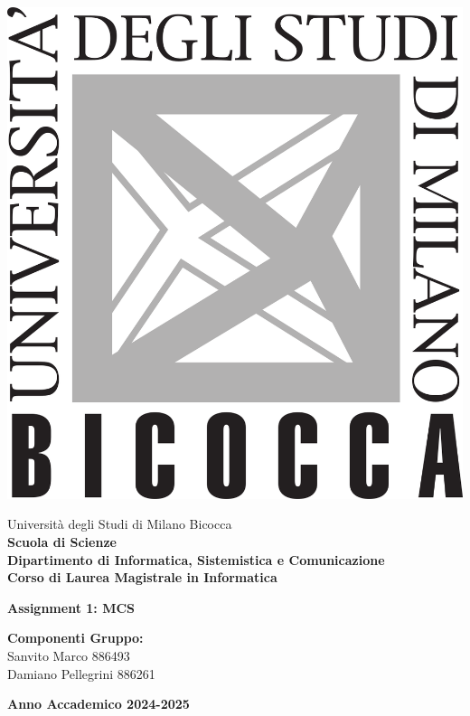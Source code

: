 \setlength\intextsep{0pt}

\noindent
\begin{minipage}{0.2\textwidth}
  \includegraphics[width=5\baselineskip]{images/bicocca_logo.png}
\end{minipage}%
\begin{minipage}{0.8\textwidth}
  Università degli Studi di Milano Bicocca \\[8pt]
  \textbf{Scuola di Scienze} \\[8pt]
  \textbf{Dipartimento di Informatica, Sistemistica e Comunicazione}\\[8pt]
  \textbf{Corso di Laurea Magistrale in Informatica}
\end{minipage}

\vspace{30mm}

\begin{center}
    \Huge
    \textbf{Assignment 1: MCS}
\end{center}

\vspace{60mm}

\large
\noindent
\textbf{Componenti Gruppo:} \\[7pt]
Sanvito Marco 886493 \\[7pt]
Damiano Pellegrini 886261 \\[20pt]

\vspace{35mm}


\begin{center}
\textbf{Anno Accademico 2024-2025}
\end{center}
\newpage